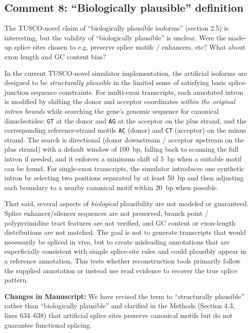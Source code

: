 \documentclass[11pt]{article}
\newcommand{\tuscoNovel}{TUSCO-novel}
\begin{document}
\subsection{Comment 8: ``Biologically plausible'' definition}

\begin{reviewercomment}
The TUSCO-novel claim of ``biologically plausible isoforms'' (section 2.5) is interesting, but the validity of ``biologically plausible'' is unclear. Were the made-up splice sites chosen to e.g. preserve splice motifs / enhancers, etc? What about exon length and GC content bias?
\end{reviewercomment}

\begin{responseboxnew}
In the current \tuscoNovel{} simulator implementation, the artificial isoforms are designed to be \emph{structurally plausible} in the limited sense of satisfying basic splice-junction sequence constraints. For multi-exon transcripts, each annotated intron is modified by shifting the donor and acceptor coordinates \emph{within the original intron bounds} while searching the gene's genomic sequence for canonical dinucleotides: \texttt{GT} at the donor and \texttt{AG} at the acceptor on the plus strand, and the corresponding reference-strand motifs \texttt{AC} (donor) and \texttt{CT} (acceptor) on the minus strand. The search is directional (donor downstream / acceptor upstream on the plus strand) with a default window of 100~bp, falling back to scanning the full intron if needed, and it enforces a minimum shift of 5~bp when a suitable motif can be found. For single-exon transcripts, the simulator introduces one synthetic intron by selecting two positions separated by at least 50~bp and then adjusting each boundary to a nearby canonical motif within 20~bp when possible.

That said, several aspects of \emph{biological} plausibility are not modeled or guaranteed. Splice enhancer/silencer sequences are not preserved, branch point / polypyrimidine tract features are not verified, and GC content or exon-length distributions are not matched. The goal is not to generate transcripts that would necessarily be spliced in vivo, but to create misleading annotations that are superficially consistent with simple splice-site rules and could plausibly appear in a reference annotation. This tests whether reconstruction tools primarily follow the supplied annotation or instead use read evidence to recover the true splice pattern.

\vspace{0.3cm}
\textbf{Changes in Manuscript:} We have revised the term to ``structurally plausible'' rather than ``biologically plausible'' and clarified in the Methods (Section 4.3, lines 634--638) that artificial splice sites preserve canonical motifs but do not guarantee functional splicing.
\end{responseboxnew}
\end{document}
